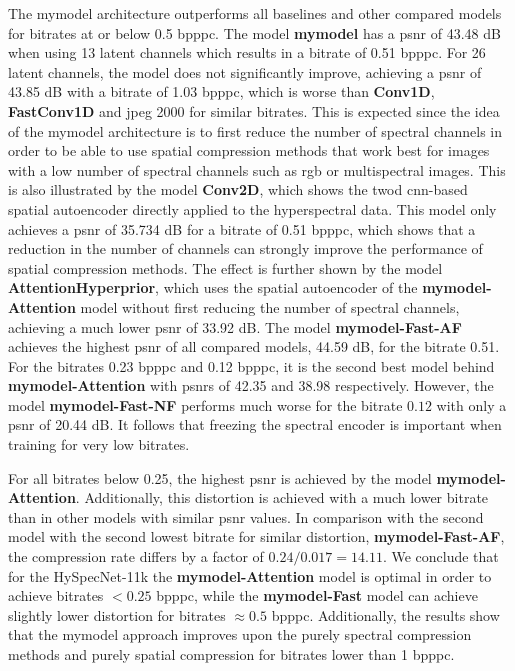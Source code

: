 The \ac{mymodel} architecture outperforms all baselines and other compared models for bitrates at or below 0.5 \ac{bpppc}. The model \textbf{\ac{mymodel}} has a \ac{psnr} of 43.48 dB when using 13 latent channels which results in a bitrate of 0.51 \ac{bpppc}. For 26 latent channels, the model does not significantly improve, achieving a \ac{psnr} of 43.85 dB with a bitrate of 1.03 \ac{bpppc}, which is worse than \textbf{Conv1D}, \textbf{FastConv1D} and \ac{jpeg} 2000 for similar bitrates. This is expected since the idea of the \ac{mymodel} architecture is to first reduce the number of spectral channels in order to be able to use spatial compression methods that work best for images with a low number of spectral channels such as \ac{rgb} or multispectral images. This is also illustrated by the model \textbf{Conv2D}, which shows the \ac{twod} \ac{cnn}-based spatial autoencoder directly applied to the hyperspectral data. This model only achieves a \ac{psnr} of 35.734 dB for a bitrate of 0.51 \ac{bpppc}, which shows that a reduction in the number of channels can strongly improve the performance of spatial compression methods. The effect is further shown by the model \textbf{AttentionHyperprior}, which uses the spatial autoencoder of the \textbf{\ac{mymodel}-Attention} model without first reducing the number of spectral channels, achieving a much lower \ac{psnr} of 33.92 dB. The model \textbf{\ac{mymodel}-Fast-AF} achieves the highest \ac{psnr} of all compared models, 44.59 dB, for the bitrate 0.51. For the bitrates 0.23 \ac{bpppc} and 0.12 \ac{bpppc}, it is the second best model behind \textbf{\ac{mymodel}-Attention} with \acp{psnr} of 42.35 and 38.98 respectively. However, the model \textbf{\ac{mymodel}-Fast-NF} performs much worse for the bitrate $0.12$ with only a \ac{psnr} of 20.44 dB. It follows that freezing the spectral encoder is important when training for very low bitrates.

For all bitrates below 0.25, the highest \ac{psnr} is achieved by the model \textbf{\ac{mymodel}-Attention}. Additionally, this distortion is achieved with a much lower bitrate than in other models with similar \ac{psnr} values. In comparison with the second model with the second lowest bitrate for similar distortion, \textbf{\ac{mymodel}-Fast-AF}, the compression rate differs by a factor of $0.24/0.017=14.11$. We conclude that for the HySpecNet-11k the \textbf{\ac{mymodel}-Attention} model is optimal in order to achieve bitrates $<0.25$ \ac{bpppc}, while the \textbf{\ac{mymodel}-Fast} model can achieve slightly lower distortion for bitrates $\approx 0.5$ \ac{bpppc}. Additionally, the results show that the \ac{mymodel} approach improves upon the purely spectral compression methods and purely spatial compression for bitrates lower than 1 \ac{bpppc}. 







